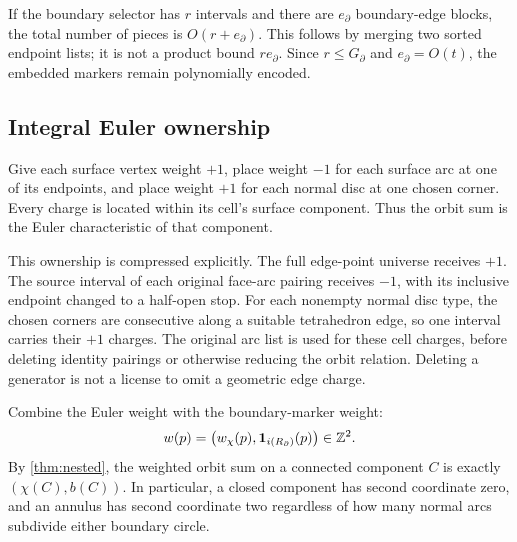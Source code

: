 If the boundary selector has $r$ intervals and there are $e_\partial$
boundary-edge blocks, the total number of pieces is $O(r+e_\partial)$.
This follows by merging two sorted endpoint lists; it is not a product
bound $r e_\partial$. Since $r\le G_\partial$ and
$e_\partial=O(t)$, the embedded markers remain polynomially encoded.

\subsection{Integral Euler ownership}

Give each surface vertex weight $+1$, place weight $-1$ for each surface
arc at one of its endpoints, and place weight $+1$ for each normal disc at
one chosen corner. Every charge is located within its cell's surface
component. Thus the orbit sum is the Euler characteristic of that component.

This ownership is compressed explicitly. The full edge-point universe
receives $+1$. The source interval of each original face-arc pairing
receives $-1$, with its inclusive endpoint changed to a half-open stop.
For each nonempty normal disc type, the chosen corners are consecutive
along a suitable tetrahedron edge, so one interval carries their $+1$
charges. The original arc list is used for these cell charges, before
deleting identity pairings or otherwise reducing the orbit relation.
Deleting a generator is not a license to omit a geometric edge charge.

Combine the Euler weight with the boundary-marker weight:
\begin{equation}
 w(p)=\bigl(w_\chi(p),\mathbf1_{i(R_\partial)}(p)\bigr)\in\mathbb Z^2.
 \label{eq:two-weights}
\end{equation}
By \cref{thm:nested}, the weighted orbit sum on a connected component $C$ is
exactly $(\chi(C),b(C))$. In particular, a closed component has second
coordinate zero, and an annulus has second coordinate two regardless of
how many normal arcs subdivide either boundary circle.
